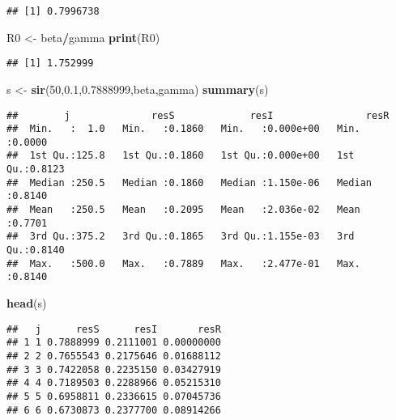 \documentclass[
]{article}
\newenvironment{Shaded}{\begin{snugshade}}{\end{snugshade}}
\newcommand{\DecValTok}[1]{\textcolor[rgb]{0.00,0.00,0.81}{#1}}
\newcommand{\FloatTok}[1]{\textcolor[rgb]{0.00,0.00,0.81}{#1}}
\newcommand{\KeywordTok}[1]{\textcolor[rgb]{0.13,0.29,0.53}{\textbf{#1}}}
\newcommand{\NormalTok}[1]{#1}
\newcommand{\OperatorTok}[1]{\textcolor[rgb]{0.81,0.36,0.00}{\textbf{#1}}}
\newcommand{\StringTok}[1]{\textcolor[rgb]{0.31,0.60,0.02}{#1}}
\begin{document}
\begin{verbatim}
## [1] 0.7996738
\end{verbatim}

\begin{Shaded}
\begin{Highlighting}[]
\NormalTok{R0 <-}\StringTok{ }\NormalTok{beta}\OperatorTok{/}\NormalTok{gamma}
\KeywordTok{print}\NormalTok{(R0)}
\end{Highlighting}
\end{Shaded}

\begin{verbatim}
## [1] 1.752999
\end{verbatim}

\begin{Shaded}
\begin{Highlighting}[]
\NormalTok{s <-}\StringTok{ }\KeywordTok{sir}\NormalTok{(}\DecValTok{50}\NormalTok{,}\FloatTok{0.1}\NormalTok{,}\FloatTok{0.7888999}\NormalTok{,beta,gamma)}
\KeywordTok{summary}\NormalTok{(s)}
\end{Highlighting}
\end{Shaded}

\begin{verbatim}
##        j              resS             resI                resR       
##  Min.   :  1.0   Min.   :0.1860   Min.   :0.000e+00   Min.   :0.0000  
##  1st Qu.:125.8   1st Qu.:0.1860   1st Qu.:0.000e+00   1st Qu.:0.8123  
##  Median :250.5   Median :0.1860   Median :1.150e-06   Median :0.8140  
##  Mean   :250.5   Mean   :0.2095   Mean   :2.036e-02   Mean   :0.7701  
##  3rd Qu.:375.2   3rd Qu.:0.1865   3rd Qu.:1.155e-03   3rd Qu.:0.8140  
##  Max.   :500.0   Max.   :0.7889   Max.   :2.477e-01   Max.   :0.8140
\end{verbatim}

\begin{Shaded}
\begin{Highlighting}[]
\KeywordTok{head}\NormalTok{(s)}
\end{Highlighting}
\end{Shaded}

\begin{verbatim}
##   j      resS      resI       resR
## 1 1 0.7888999 0.2111001 0.00000000
## 2 2 0.7655543 0.2175646 0.01688112
## 3 3 0.7422058 0.2235150 0.03427919
## 4 4 0.7189503 0.2288966 0.05215310
## 5 5 0.6958811 0.2336615 0.07045736
## 6 6 0.6730873 0.2377700 0.08914266
\end{verbatim}
\end{document}
